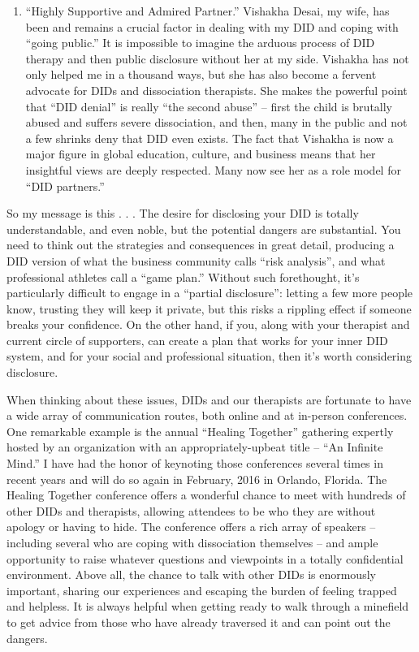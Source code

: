 \documentclass[]{book}
\begin{document}
\begin{enumerate}
\item
  ``Highly Supportive and Admired Partner.'' Vishakha Desai, my wife, has been and remains a crucial factor in dealing with my DID and coping with ``going public.'' It is impossible to imagine the arduous process of DID therapy and then public disclosure without her at my side. Vishakha has not only helped me in a thousand ways, but she has also become a fervent advocate for DIDs and dissociation therapists. She makes the powerful point that ``DID denial'' is really ``the second abuse'' -- first the child is brutally abused and suffers severe dissociation, and then, many in the public and not a few shrinks deny that DID even exists. The fact that Vishakha is now a major figure in global education, culture, and business means that her insightful views are deeply respected. Many now see her as a role model for ``DID partners.''
\end{enumerate}

So my message is this . . . The desire for disclosing your DID is totally understandable, and even noble, but the potential dangers are substantial. You need to think out the strategies and consequences in great detail, producing a DID version of what the business community calls ``risk analysis'', and what professional athletes call a ``game plan.'' Without such forethought, it's particularly difficult to engage in a ``partial disclosure'': letting a few more people know, trusting they will keep it private, but this risks a rippling effect if someone breaks your confidence. On the other hand, if you, along with your therapist and current circle of supporters, can create a plan that works for your inner DID system, and for your social and professional situation, then it's worth considering disclosure.

When thinking about these issues, DIDs and our therapists are fortunate to have a wide array of communication routes, both online and at in-person conferences. One remarkable example is the annual ``Healing Together'' gathering expertly hosted by an organization with an appropriately-upbeat title -- ``An Infinite Mind.'' I have had the honor of keynoting those conferences several times in recent years and will do so again in February, 2016 in Orlando, Florida. The Healing Together conference offers a wonderful chance to meet with hundreds of other DIDs and therapists, allowing attendees to be who they are without apology or having to hide. The conference offers a rich array of speakers -- including several who are coping with dissociation themselves -- and ample opportunity to raise whatever questions and viewpoints in a totally confidential environment. Above all, the chance to talk with other DIDs is enormously important, sharing our experiences and escaping the burden of feeling trapped and helpless. It is always helpful when getting ready to walk through a minefield to get advice from those who have already traversed it and can point out the dangers.
\end{document}

